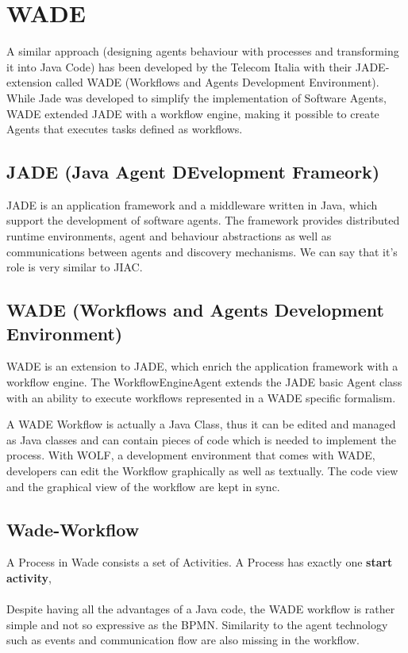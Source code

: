 \section{WADE}
A similar approach (designing agents behaviour with processes and transforming it into Java Code) has been developed by the Telecom Italia with their JADE-extension called WADE (Workflows and Agents Development Environment). While Jade was developed to simplify the implementation of Software Agents, WADE extended JADE with a workflow engine, making it possible to create Agents that executes tasks defined as workflows.

\subsection{JADE (\textbf{J}ava \textbf{A}gent \textbf{DE}velopment Frameork)}
JADE is an application framework and a middleware written in Java, which support the development of software agents. The framework  provides distributed runtime environments, agent and behaviour abstractions as well as communications between agents and discovery mechanisms. We can say that it's role is very similar to JIAC.

\subsection{WADE (Workflows and Agents Development Environment)}
WADE is an extension to JADE, which enrich the application framework with a workflow engine. The WorkflowEngineAgent extends the JADE basic Agent class with an ability to execute workflows represented in a WADE specific formalism.

A WADE Workflow is actually a Java Class, thus it can be edited and managed as Java classes and can contain pieces of code which is needed to implement the process. With WOLF, a development environment that comes with WADE, developers can edit the Workflow graphically as well as textually. The code view and the graphical view of the workflow are kept in sync. 


\subsection{Wade-Workflow}
A Process in Wade consists a set of Activities. A Process has exactly one \textbf{start activity},
\\\\
Despite having all the advantages of a Java code, the WADE workflow is rather simple and not so expressive as the BPMN. Similarity to the agent technology such as events and communication flow are also missing in the workflow. 